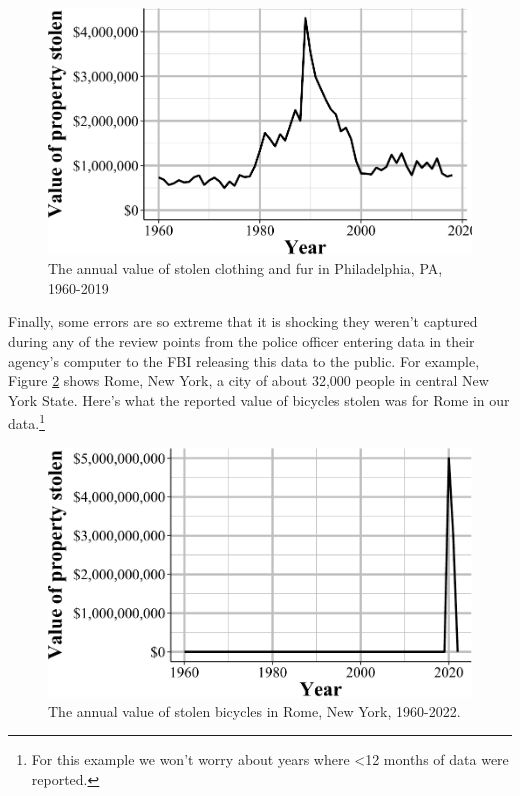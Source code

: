\documentclass[
  12pt,
  openany]{book}
\begin{document}
\begin{figure}

{\centering \includegraphics[width=0.9\linewidth]{04_stolen_property_files/figure-latex/phillyFurValue-1} 

}

\caption{The annual value of stolen clothing and fur in Philadelphia, PA, 1960-2019}\label{fig:phillyFurValue}
\end{figure}

Finally, some errors are so extreme that it is shocking they weren't captured during any of the review points from the police officer entering data in their agency's computer to the FBI releasing this data to the public. For example, Figure \ref{fig:romeBicycles} shows Rome, New York, a city of about 32,000 people in central New York State. Here's what the reported value of bicycles stolen was for Rome in our data.\footnote{For this example we won't worry about years where \textless12 months of data were reported.}

\begin{figure}

{\centering \includegraphics[width=0.9\linewidth]{04_stolen_property_files/figure-latex/romeBicycles-1} 

}

\caption{The annual value of stolen bicycles in Rome, New York, 1960-2022.}\label{fig:romeBicycles}
\end{figure}
\end{document}
